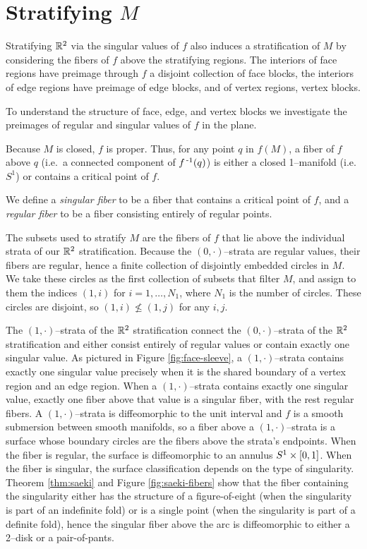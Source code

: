 \section{Stratifying $M$}

Stratifying $\mathbb{R}^2$ via the singular values of $f$ also induces a stratification of $M$
by considering the fibers of $f$ above the stratifying regions.
The interiors of face regions have preimage through $f$ a disjoint collection of face blocks, the interiors of edge regions have preimage of edge blocks, and of vertex regions, vertex blocks.

To understand the structure of face, edge, and vertex blocks we investigate the preimages of regular and singular values of $f$ in the plane.
\begin{defn}
	Because $M$ is closed, $f$ is proper.
	Thus, for any point $q$ in $f(M)$, a fiber of $f$ above $q$ (i.e.\ a connected component of $f^{\,\text{-}1}(q)$) is either a closed 1--manifold (i.e.\ $S^1$) or contains a critical point of $f$.
	
	We define a \emph{singular fiber} to be a fiber that contains a critical point of $f$, and a \emph{regular fiber} to be a fiber consisting entirely of regular points.	
\end{defn}

The subsets used to stratify $M$ are the fibers of $f$ that lie above the individual strata of our $\mathbb{R}^2$ stratification.
Because the $(0,\cdot)$--strata are regular values, their fibers are regular, hence a finite collection of disjointly embedded circles in $M$.
We take these circles as the first collection of subsets that filter $M$, and assign to them the indices $(1,i)$ for $i = 1,\dots, N_1$, where $N_1$ is the number of circles.
These circles are disjoint, so $(1,i)\nleq (1,j)$ for any $i,j$.

The $(1,\cdot)$--strata of the $\mathbb{R}^2$ stratification connect the $(0,\cdot)$--strata of the $\mathbb{R}^2$ stratification and either consist entirely of regular values or contain exactly one singular value.
As pictured in Figure \ref{fig:face-sleeve}, a $(1,\cdot)$--strata contains exactly one singular value precisely when it is the shared boundary of a vertex region and an edge region.
When a $(1,\cdot)$--strata contains exactly one singular value, exactly one fiber above that value is a singular fiber, with the rest regular fibers.
A $(1,\cdot)$--strata is diffeomorphic to the unit interval and $f$ is a smooth submersion between smooth manifolds, so a fiber above a $(1,\cdot)$--strata is a surface whose boundary circles are the fibers above the strata's endpoints.
When the fiber is regular, the surface is diffeomorphic to an annulus $S^1\times[0,1]$.
When the fiber is singular, the surface classification depends on the type of singularity.
Theorem \ref{thm:saeki} and Figure \ref{fig:saeki-fibers} show that the fiber containing the singularity either has the structure of a figure-of-eight (when the singularity is part of an indefinite fold) or is a single point (when the singularity is part of a definite fold), hence the singular fiber above the arc is diffeomorphic to either a 2--disk or a pair-of-pants.

